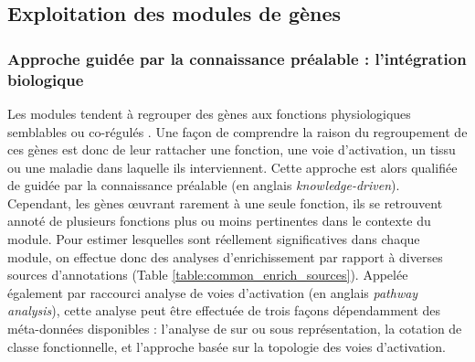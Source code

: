 \subsection{Exploitation des modules de gènes}

\subsubsection{Approche guidée par la connaissance préalable : l'intégration biologique}

Les modules tendent à regrouper des gènes aux fonctions physiologiques semblables ou co-régulés \cite{Barabasi2011Jan,Lorenz2011}. Une façon de comprendre la raison du regroupement de ces gènes est donc de leur rattacher une fonction, une voie d'activation, un tissu ou une maladie dans laquelle ils interviennent. Cette approche est alors qualifiée de guidée par la connaissance préalable (en anglais \textit{knowledge-driven}). Cependant, les gènes œuvrant rarement à une seule fonction, ils se retrouvent annoté de plusieurs fonctions \cite{Green2006Aug} plus ou moins pertinentes dans le contexte du module. Pour estimer lesquelles sont réellement significatives dans chaque module, on effectue donc des analyses d'enrichissement \cite{Khatri2012} par rapport à diverses sources d'annotations (Table \ref{table:common_enrich_sources}). Appelée également par raccourci analyse de voies d'activation (en anglais \textit{pathway analysis}), cette analyse peut être effectuée de trois façons dépendamment des méta-données disponibles : l'analyse de sur ou sous représentation, la cotation de classe fonctionnelle, et l'approche basée sur la topologie des voies d'activation. 


